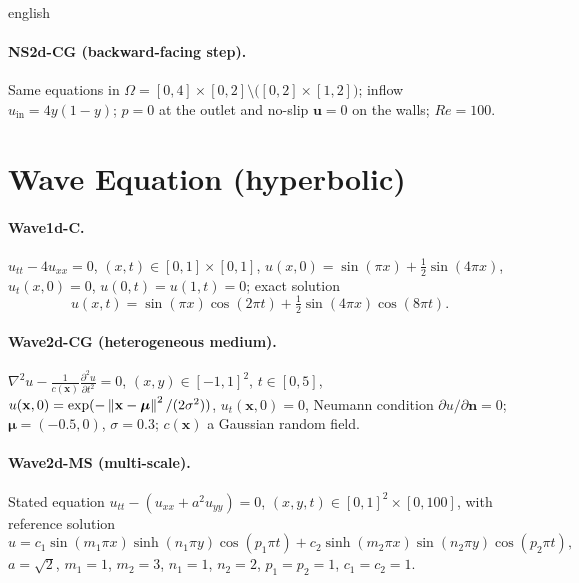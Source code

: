 \documentclass[0000.tex]{subfiles}
\begin{document}
\begin{hyphenrules}{english}
\paragraph{NS2d-CG (backward-facing step).} Same equations in
$\Omega=[0,4]\times[0,2]\setminus\big([0,2]\times[1,2]\big)$; inflow $u_{\mathrm{in}}=4y(1-y)$; $p=0$ at the
outlet and no-slip $\mathbf{u}=0$ on the walls; $Re=100$.

\section{Wave Equation (hyperbolic)}
\paragraph{Wave1d-C.} $u_{tt}-4u_{xx}=0$, $(x,t)\in[0,1]\times[0,1]$,
$u(x,0)=\sin(\pi x)+\frac12\sin(4\pi x)$, $u_t(x,0)=0$, $u(0,t)=u(1,t)=0$; exact solution
\[
  u(x,t)=\sin(\pi x)\cos(2\pi t)+\tfrac12\sin(4\pi x)\cos(8\pi t).
\]

\paragraph{Wave2d-CG (heterogeneous medium).} $\nabla^2u-\frac{1}{c(\mathbf{x})}\frac{\partial^2u}{\partial t^2}=0$,
$(x,y)\in[-1,1]^2$, $t\in[0,5]$, $u(\mathbf{x},0)=\exp(-\left\lVert \mathbf{x}-\bm\mu \right\rVert^2/(2\sigma^2))$, $u_t(\mathbf{x},0)=0$, Neumann
condition $\partial u/\partial\mathbf{n}=0$; $\bm\mu=(-0.5,0)$, $\sigma=0.3$; $c(\mathbf{x})$ a Gaussian random field.

\paragraph{Wave2d-MS (multi-scale).} Stated equation $u_{tt}-(u_{xx}+a^2u_{yy})=0$,
$(x,y,t)\in[0,1]^2\times[0,100]$, with reference solution
\[
  u=c_1\sin(m_1\pi x)\sinh(n_1\pi y)\cos(p_1\pi t)+c_2\sinh(m_2\pi x)\sin(n_2\pi y)\cos(p_2\pi t),
\]
$a=\sqrt2$, $m_1=1$, $m_2=3$, $n_1=1$, $n_2=2$, $p_1=p_2=1$, $c_1=c_2=1$.


\end{hyphenrules}
\end{document}
